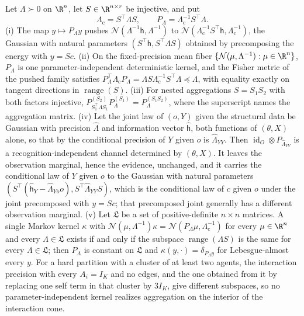 Let \(\Lambda\succ0\) on \(\R^n\), let \(S\in\R^{n\times r}\) be injective,
and put
\begin{equation}
\Lambda_{\mathrm c}=S^\top\Lambda S,
\qquad
P_\Lambda=\Lambda_{\mathrm c}^{-1}S^\top\Lambda .
\label{eq:ig-galerkin-projector}
\end{equation}
(i) The map \(y\mapsto P_\Lambda y\) pushes
\(\mathcal N(\Lambda^{-1}\mathsf h,\Lambda^{-1})\) to
\(\mathcal N(\Lambda_{\mathrm c}^{-1}S^\top\mathsf h,\Lambda_{\mathrm c}^{-1})\),
the Gaussian with natural parameters \((S^\top\mathsf h,S^\top\Lambda S)\)
obtained by precomposing the energy with \(y=Sc\).
(ii) On the fixed-precision mean fiber
\(\{\mathcal N(\mu,\Lambda^{-1}):\mu\in\R^n\}\), \(P_\Lambda\) is one
parameter-independent deterministic kernel, and the Fisher metric of the pushed
family satisfies
\(P_\Lambda^\top\Lambda_{\mathrm c}P_\Lambda
=\Lambda S\Lambda_{\mathrm c}^{-1}S^\top\Lambda\preceq\Lambda\), with equality
exactly on tangent directions in \(\operatorname{range}(S)\).
(iii) For nested aggregations \(S=S_1S_2\) with both factors injective,
\(P^{(S_2)}_{S_1^\top\Lambda S_1}P^{(S_1)}_\Lambda=P^{(S_1S_2)}_\Lambda\), where
the superscript names the aggregation matrix.
(iv) Let the joint law of \((o,Y)\) given the structural data be Gaussian with
precision \(\widehat\Lambda\) and information vector \(\widehat{\mathsf h}\), both
functions of \((\theta,X)\) alone, so that by
 the conditional
precision of \(Y\) given \(o\) is \(\widehat\Lambda_{YY}\). Then
\(\operatorname{id}_O\otimes P_{\widehat\Lambda_{YY}}\) is a recognition-independent
channel determined by \((\theta,X)\). It leaves the observation marginal, hence
the evidence, unchanged, and it carries the conditional law of \(Y\) given \(o\)
to the Gaussian with natural parameters
\((S^\top(\widehat{\mathsf h}_Y-\widehat\Lambda_{Yo}o),S^\top\widehat\Lambda_{YY}S)\), which is the
conditional law of \(c\) given \(o\) under the joint precomposed with \(y=Sc\);
that precomposed joint generally has a different observation marginal.
(v) Let \(\mathfrak L\) be a set of positive-definite \(n\times n\) matrices. A
single Markov kernel \(\kappa\) with
\(\mathcal N(\mu,\Lambda^{-1})\kappa=\mathcal N(P_\Lambda\mu,\Lambda_{\mathrm c}^{-1})\)
for every \(\mu\in\R^n\) and every \(\Lambda\in\mathfrak L\) exists if and only
if the subspace \(\operatorname{range}(\Lambda S)\) is the same for every
\(\Lambda\in\mathfrak L\); then \(P_\Lambda\) is constant on \(\mathfrak L\) and
\(\kappa(y,\cdot)=\delta_{P_\Lambda y}\) for Lebesgue-almost every \(y\). For a
hard partition with a cluster of at least two agents, the interaction precision
with every \(A_i=I_K\) and no edges, and the one obtained from it by replacing
one self term in that cluster by \(3I_K\), give different subspaces, so no
parameter-independent kernel realizes aggregation on the interior of the
interaction cone. 

